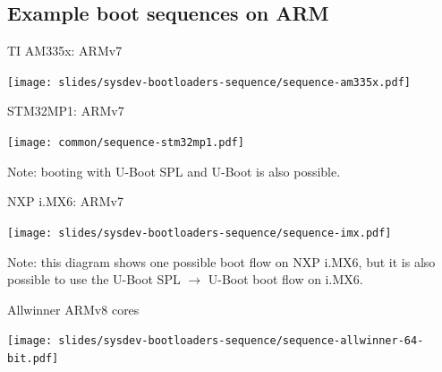 \subsection{Example boot sequences on ARM}

\begin{frame}{TI AM335x: ARMv7}
  \begin{center}
    \texttt{[image: slides/sysdev-bootloaders-sequence/sequence-am335x.pdf]}
  \end{center}
\end{frame}

\begin{frame}{STM32MP1: ARMv7}
  \begin{center}
    \texttt{[image: common/sequence-stm32mp1.pdf]}
  \end{center}
  \vspace{0.3cm}
  Note: booting with U-Boot SPL and U-Boot is also possible.
\end{frame}

\begin{frame}{NXP i.MX6: ARMv7}
  \begin{center}
    \texttt{[image: slides/sysdev-bootloaders-sequence/sequence-imx.pdf]}
  \end{center}
  \vspace{0.1cm}
  Note: this diagram shows one possible boot flow on NXP i.MX6, but it
  is also possible to use the U-Boot SPL $\rightarrow$ U-Boot boot
  flow on i.MX6.
\end{frame}

\begin{frame}{Allwinner ARMv8 cores}
  \begin{center}
    \texttt{[image: slides/sysdev-bootloaders-sequence/sequence-allwinner-64-bit.pdf]}
  \end{center}
\end{frame}
